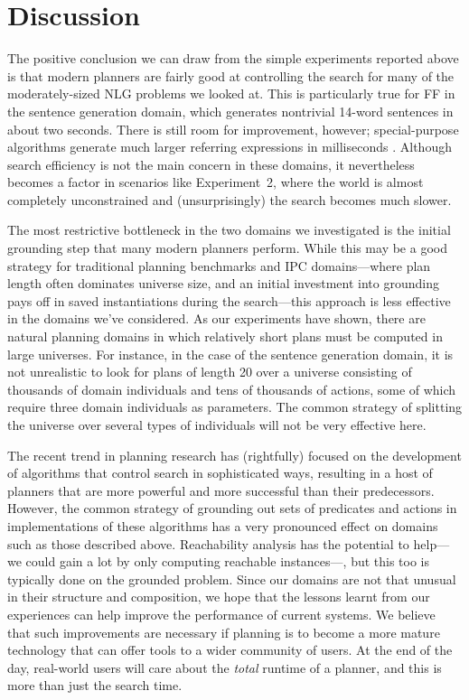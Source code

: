 \section{Discussion} \label{sec:discussion}

The positive conclusion we can draw from the simple experiments
reported above is that modern planners are fairly good at controlling
the search for many of the moderately-sized NLG problems we looked
at. This is particularly true for FF in the sentence generation
domain, which generates nontrivial 14-word sentences in about two
seconds. There is still room for improvement, however; special-purpose
algorithms generate much larger referring expressions in milliseconds
\cite{AreKolStr08}.  Although search efficiency is not the main
concern in these domains, it nevertheless becomes a factor in
scenarios like Experiment~2, where the world is almost completely
unconstrained and (unsurprisingly) the search becomes much slower.

The most restrictive bottleneck in the two domains we investigated is
the initial grounding step that many modern planners perform. While
this may be a good strategy for traditional planning benchmarks and
IPC domains---where plan length often dominates universe size, and an
initial investment into grounding pays off in saved instantiations
during the search---this approach is less effective in the domains
we've considered. As our experiments have shown, there are natural
planning domains in which relatively short plans must be computed in
large universes. For instance, in the case of the sentence generation
domain, it is not unrealistic to look for plans of length 20 over a
universe consisting of thousands of domain individuals and tens of
thousands of actions, some of which require three domain individuals
as parameters. The common strategy of splitting the universe over
several types of individuals will not be very effective here.

The recent trend in planning research has (rightfully) focused on the
development of algorithms that control search in sophisticated ways,
resulting in a host of planners that are more powerful and more
successful than their predecessors. However, the common strategy of
grounding out sets of predicates and actions in implementations of
these algorithms has a very pronounced effect on domains such as those
described above. Reachability analysis has the potential to help---we
could gain a lot by only computing reachable instances---, but this
too is typically done on the grounded problem.  Since our domains are not that unusual in their structure and
composition, we hope that the lessons learnt from our experiences can
help improve the performance of current systems. We believe that such
improvements are necessary if planning is to become a more mature
technology that can offer tools to a wider community of users. At the
end of the day, real-world users will care about the \emph{total}
runtime of a planner, and this is more than just the search time.

